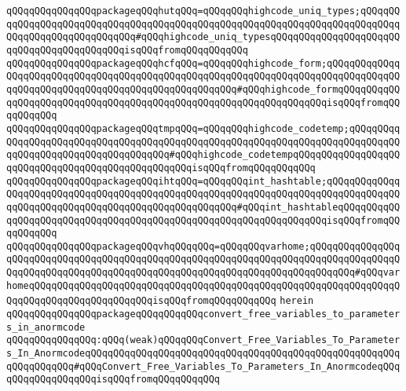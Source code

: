 \verb|qQQqqQQqqQQqqQQqpackageqQQqhutqQQq=qQQqqQQqhighcode_uniq_types;qQQqqQQqqQQqqQQqqQQqqQQqqQQqqQQqqQQqqQQqqQQqqQQqqQQqqQQqqQQqqQQqqQQqqQQqqQQqqQQqqQQqqQQqqQQqqQQqqQQq#qQQqhighcode_uniq_typesqQQqqQQqqQQqqQQqqQQqqQQqqQQqqQQqqQQqqQQqqQQqisqQQqfromqQQqqQQqqQQq|\newline
\verb|qQQqqQQqqQQqqQQqpackageqQQqhcfqQQq=qQQqqQQqhighcode_form;qQQqqQQqqQQqqQQqqQQqqQQqqQQqqQQqqQQqqQQqqQQqqQQqqQQqqQQqqQQqqQQqqQQqqQQqqQQqqQQqqQQqqQQqqQQqqQQqqQQqqQQqqQQqqQQqqQQqqQQqqQQq#qQQqhighcode_formqQQqqQQqqQQqqQQqqQQqqQQqqQQqqQQqqQQqqQQqqQQqqQQqqQQqqQQqqQQqqQQqqQQqisqQQqfromqQQqqQQqqQQq|\newline
\verb|qQQqqQQqqQQqqQQqpackageqQQqtmpqQQq=qQQqqQQqhighcode_codetemp;qQQqqQQqqQQqqQQqqQQqqQQqqQQqqQQqqQQqqQQqqQQqqQQqqQQqqQQqqQQqqQQqqQQqqQQqqQQqqQQqqQQqqQQqqQQqqQQqqQQqqQQqqQQq#qQQqhighcode_codetempqQQqqQQqqQQqqQQqqQQqqQQqqQQqqQQqqQQqqQQqqQQqqQQqqQQqisqQQqfromqQQqqQQqqQQq|\newline
\verb|qQQqqQQqqQQqqQQqpackageqQQqihtqQQq=qQQqqQQqint_hashtable;qQQqqQQqqQQqqQQqqQQqqQQqqQQqqQQqqQQqqQQqqQQqqQQqqQQqqQQqqQQqqQQqqQQqqQQqqQQqqQQqqQQqqQQqqQQqqQQqqQQqqQQqqQQqqQQqqQQqqQQqqQQq#qQQqint_hashtableqQQqqQQqqQQqqQQqqQQqqQQqqQQqqQQqqQQqqQQqqQQqqQQqqQQqqQQqqQQqqQQqqQQqisqQQqfromqQQqqQQqqQQq|\newline
\verb|qQQqqQQqqQQqqQQqpackageqQQqvhqQQqqQQq=qQQqqQQqvarhome;qQQqqQQqqQQqqQQqqQQqqQQqqQQqqQQqqQQqqQQqqQQqqQQqqQQqqQQqqQQqqQQqqQQqqQQqqQQqqQQqqQQqqQQqqQQqqQQqqQQqqQQqqQQqqQQqqQQqqQQqqQQqqQQqqQQqqQQqqQQqqQQqqQQq#qQQqvarhomeqQQqqQQqqQQqqQQqqQQqqQQqqQQqqQQqqQQqqQQqqQQqqQQqqQQqqQQqqQQqqQQqqQQqqQQqqQQqqQQqqQQqqQQqqQQqisqQQqfromqQQqqQQqqQQq|\newline
\verb|herein|\newline
\newline
\verb|qQQqqQQqqQQqqQQqpackageqQQqqQQqqQQqconvert_free_variables_to_parameters_in_anormcode|\newline
\verb|qQQqqQQqqQQqqQQq:qQQq(weak)qQQqqQQqConvert_Free_Variables_To_Parameters_In_AnormcodeqQQqqQQqqQQqqQQqqQQqqQQqqQQqqQQqqQQqqQQqqQQqqQQqqQQqqQQqqQQqqQQqqQQq#qQQqConvert_Free_Variables_To_Parameters_In_AnormcodeqQQqqQQqqQQqqQQqqQQqisqQQqfromqQQqqQQqqQQq|\newline
